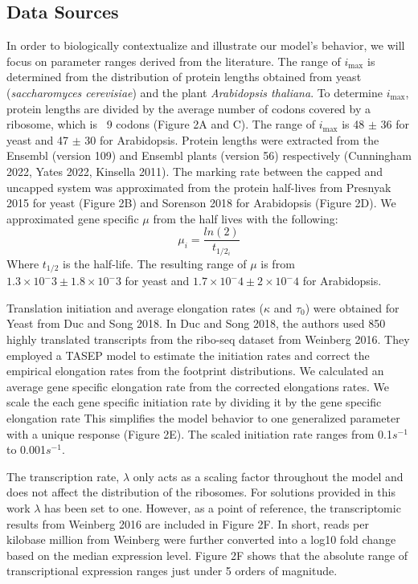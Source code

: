 \documentclass[review]{elsarticle}
\newcommand{\imax}{\ensuremath{{i_{\max}}}\xspace}
\begin{document}
\subsection{Data Sources}

In order to biologically contextualize and illustrate our model's behavior, we will focus on parameter ranges derived from the literature.
The range of \imax is determined from the distribution of protein lengths obtained from yeast (\textit{saccharomyces cerevisiae}) and the plant \textit{Arabidopsis thaliana}. To determine \imax, protein lengths are divided by the average number of codons covered by a ribosome, which is ~9 codons (Figure 2A and C). The range of \imax is  48 $\pm$ 36 for yeast and 47 $\pm$ 30 for Arabidopsis.
Protein lengths were extracted from the Ensembl (version 109) and Ensembl plants (version 56) respectively (Cunningham 2022, Yates 2022, Kinsella 2011).  
The marking rate between the capped and uncapped system was approximated from the protein half-lives from Presnyak 2015 for yeast (Figure 2B) and Sorenson 2018 for Arabidopsis (Figure 2D).
We approximated gene specific $\mu$ from the half lives with the following:
	\begin{equation*}
		\mu_i = \frac{ln(2)}{t_{1/2_i}}
	\end{equation*}
Where $t_{1/2}$ is the half-life. The resulting range of $\mu$ is from $1.3 \times 10^-3 \pm 1.8 \times 10^-3$ for yeast and $1.7 \times 10^-4 \pm 2 \times 10^-4$ for Arabidopsis. 

Translation initiation and average elongation rates ($\kappa$ and $\tau_0$) were obtained for Yeast from Duc and Song 2018. In Duc and Song 2018, the authors used 850 highly translated transcripts from the ribo-seq dataset from Weinberg 2016. They employed a TASEP model to estimate the initiation rates and correct the empirical elongation rates from the footprint distributions. We calculated an average gene specific elongation rate from the corrected elongations rates. We scale the each gene specific initiation rate by dividing it by the gene specific elongation rate This simplifies the model behavior to one generalized parameter with a unique response (Figure 2E).  The scaled initiation rate ranges from 0.1$s^{-1}$ to 0.001$s^{-1}$.

The transcription rate, $\lambda$ only acts as a scaling factor throughout the model and does not affect the distribution of the ribosomes. For solutions provided in this work $\lambda$ has been set to one. However, as a point of reference, the transcriptomic results from Weinberg 2016 are included in Figure 2F. In short, reads per kilobase million from Weinberg were further converted into a log10 fold change based on the median expression level. Figure 2F shows that the absolute range of transcriptional expression ranges just under 5 orders of magnitude.
\end{document}
